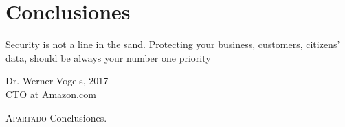 \chapter{Conclusiones}\label{chp-05}
\epigraph{Security is not a line in the sand. Protecting your business, customers, citizens’ data, should be always your number one priority}{Dr. Werner Vogels, 2017\\CTO at Amazon.com}

\lettrine[lraise=-0.1, lines=2, loversize=0.2]{A}{partado} Conclusiones. 



\endinput
